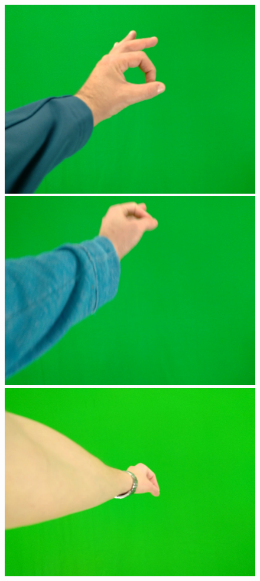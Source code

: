 \begin{figure}[htb]
\begin{minipage}[c]{0.19\linewidth}
      \includegraphics[width=0.95\linewidth]{figures/g2-12.jpg}
   \end{minipage} 
   \begin{minipage}[c]{0.19\linewidth}
      \includegraphics[width=0.95\linewidth]{figures/g2-14.jpg}
   \end{minipage} 
   \begin{minipage}[c]{0.19\linewidth}
      \includegraphics[width=0.95\linewidth]{figures/g2-16.jpg}

\end{minipage}
\end{figure}
